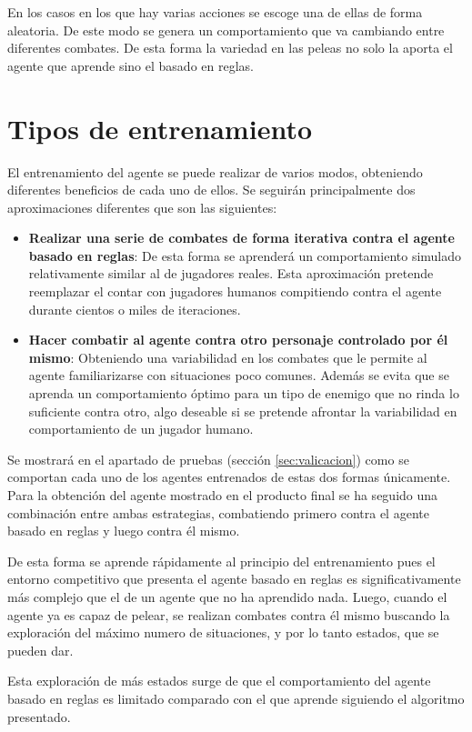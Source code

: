 En los casos en los que hay varias acciones se escoge una de ellas de forma aleatoria. De este modo se genera un comportamiento que va cambiando entre diferentes combates. De esta forma la variedad en las peleas no solo la aporta el agente que aprende sino el basado en reglas.

\section{Tipos de entrenamiento}


El entrenamiento del agente se puede realizar de varios modos, obteniendo diferentes beneficios de cada uno de ellos. Se seguirán principalmente dos aproximaciones diferentes que son las siguientes:

\begin{itemize}
	\item \textbf{Realizar una serie de combates de forma iterativa contra el agente basado en reglas}: De esta forma se aprenderá un comportamiento simulado relativamente similar al de jugadores reales. Esta aproximación pretende reemplazar el contar con jugadores humanos compitiendo contra el agente durante cientos o miles de iteraciones.
	\item \textbf{Hacer combatir al agente contra otro personaje controlado por él mismo}: Obteniendo una variabilidad en los combates que le permite al agente familiarizarse con situaciones poco comunes. Además se evita que se aprenda un comportamiento óptimo para un tipo de enemigo que no rinda lo suficiente contra otro, algo deseable si se pretende afrontar la variabilidad en comportamiento de un jugador humano. 
\end{itemize}

Se mostrará en el apartado de pruebas (sección \ref{sec:valicacion}) como se comportan cada uno de los agentes entrenados de estas dos formas únicamente. Para la obtención del agente mostrado en el producto final se ha seguido una combinación entre ambas estrategias, combatiendo primero contra el agente basado en reglas y luego contra él mismo.

\bigskip

De esta forma se aprende rápidamente al principio del entrenamiento pues el entorno competitivo que presenta el agente basado en reglas es significativamente más complejo que el de un agente que no ha aprendido nada. Luego, cuando el agente ya es capaz de pelear, se realizan combates contra él mismo buscando la exploración del máximo numero de situaciones, y por lo tanto estados, que se pueden dar.

\bigskip

Esta exploración de más estados surge de que el comportamiento del agente basado en reglas es limitado comparado con el que aprende siguiendo el algoritmo presentado.


